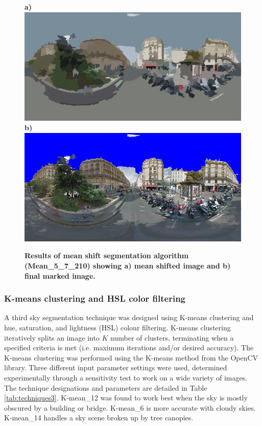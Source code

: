 \documentclass[final,3p,times,authoryear]{elsarticle}
\begin{document}
\begin{figure}
\centering    
\textbf{a)}\includegraphics[scale=0.26]{Images/2/panorama-JtVHmEl7WCiz1xJ0bcJpBg-1_seg.png} 
\textbf{b)}\includegraphics[scale=0.26]{Images/2/panorama-JtVHmEl7WCiz1xJ0bcJpBg-1_ms_sky_mark.png} 
\caption{\bf Results of mean shift segmentation algorithm (Mean\_5\_7\_210) showing a) mean shifted image and b) final marked image.}    
 \label{fig:meanresults}  
\end{figure} 



\subsubsection{K-means clustering and HSL color filtering}\label{sec:kmeans}
A third sky segmentation technique was designed using K-means clustering and hue, saturation, and lightness (HSL) colour filtering. K-means clustering iteratively splits an image into $K$ number of clusters, terminating when a specified criteria is met (i.e. maximum iterations and/or desired accuracy). The K-means clustering was performed using the K-means method from the OpenCV library. Three different input parameter settings were used, determined experimentally through a sensitivity test to work on a wide variety of images. The technique designations and parameters are detailed in Table \ref{tab:techniques3}. K-mean\_12 was found to work best when the sky is mostly obscured by a building or bridge. K-mean\_6 is more accurate with cloudy skies. K-mean\_14 handles a sky scene broken up by tree canopies.
\end{document}

